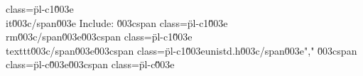 class=\"pl-c1\"\u003e\\it\u003c/span\u003e Include: \u003cspan class=\"pl-c1\"\u003e\\rm\u003c/span\u003e\u003cspan class=\"pl-c1\"\u003e\\texttt\u003c/span\u003e{\u003cspan class=\"pl-c1\"\u003eunistd.h\u003c/span\u003e}","        \u003cspan class=\"pl-c\"\u003e\u003cspan class=\"pl-c\"\u003e%